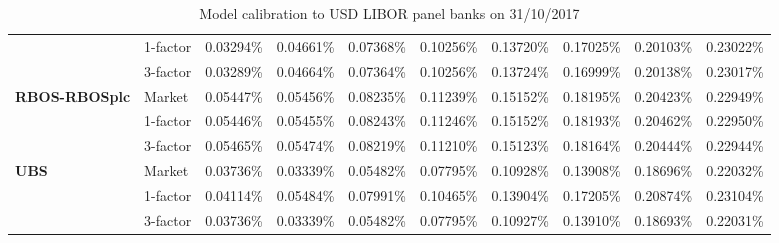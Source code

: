 \documentclass[12pt,a4paper]{article}
\theoremstyle{plain}
\numberwithin{equation}{section}
\begin{document}
\begin{table}[t]
{\begin{tabular}{|rl|cccccccc|}
\cmidrule{3-10}          & 1-factor & 0.03294\% & 0.04661\% & 0.07368\% & 0.10256\% & 0.13720\% & 0.17025\% & 0.20103\% & 0.23022\% \\
          & 3-factor & 0.03289\% & 0.04664\% & 0.07364\% & 0.10256\% & 0.13724\% & 0.16999\% & 0.20138\% & 0.23017\% \\
    \midrule
    \midrule
    \multicolumn{1}{|l}{\textbf{RBOS-RBOSplc}} & Market & 0.05447\% & 0.05456\% & 0.08235\% & 0.11239\% & 0.15152\% & 0.18195\% & 0.20423\% & 0.22949\% \\
\cmidrule{3-10}          & 1-factor & 0.05446\% & 0.05455\% & 0.08243\% & 0.11246\% & 0.15152\% & 0.18193\% & 0.20462\% & 0.22950\% \\
          & 3-factor & 0.05465\% & 0.05474\% & 0.08219\% & 0.11210\% & 0.15123\% & 0.18164\% & 0.20444\% & 0.22944\% \\
    \midrule
    \midrule
    \multicolumn{1}{|l}{\textbf{UBS}} & Market & 0.03736\% & 0.03339\% & 0.05482\% & 0.07795\% & 0.10928\% & 0.13908\% & 0.18696\% & 0.22032\% \\
\cmidrule{3-10}          & 1-factor & 0.04114\% & 0.05484\% & 0.07991\% & 0.10465\% & 0.13904\% & 0.17205\% & 0.20874\% & 0.23104\% \\
          & 3-factor & 0.03736\% & 0.03339\% & 0.05482\% & 0.07795\% & 0.10927\% & 0.13910\% & 0.18693\% & 0.22031\% \\


    \bottomrule
    \end{tabular}%
    }
     \caption{Model calibration to USD LIBOR panel banks on 31/10/2017 }
  \label{CDSfit171031}%
\end{table}%
\end{document}
